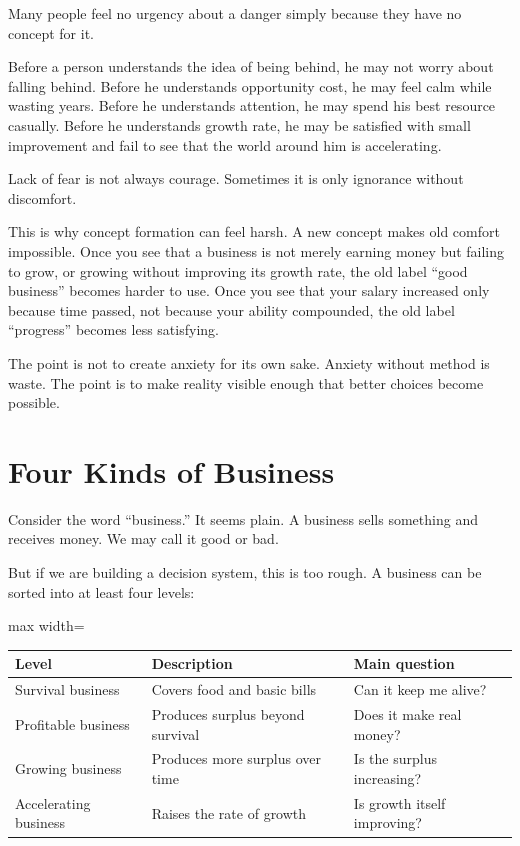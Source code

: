 Many people feel no urgency about a danger simply because they have no concept for it.

Before a person understands the idea of being behind, he may not worry about falling behind. Before he understands opportunity cost, he may feel calm while wasting years. Before he understands attention, he may spend his best resource casually. Before he understands growth rate, he may be satisfied with small improvement and fail to see that the world around him is accelerating.

Lack of fear is not always courage. Sometimes it is only ignorance without discomfort.

This is why concept formation can feel harsh. A new concept makes old comfort impossible. Once you see that a business is not merely earning money but failing to grow, or growing without improving its growth rate, the old label ``good business'' becomes harder to use. Once you see that your salary increased only because time passed, not because your ability compounded, the old label ``progress'' becomes less satisfying.

The point is not to create anxiety for its own sake. Anxiety without method is waste. The point is to make reality visible enough that better choices become possible.

\section*{Four Kinds of Business}

Consider the word ``business.'' It seems plain. A business sells something and receives money. We may call it good or bad.

But if we are building a decision system, this is too rough. A business can be sorted into at least four levels:

\begin{center}
\begin{adjustbox}{max width=\linewidth}
\begin{tabular}{lll}
\hline
Level & Description & Main question \\
\hline
Survival business & Covers food and basic bills & Can it keep me alive? \\
Profitable business & Produces surplus beyond survival & Does it make real money? \\
Growing business & Produces more surplus over time & Is the surplus increasing? \\
Accelerating business & Raises the rate of growth & Is growth itself improving? \\
\hline
\end{tabular}
\end{adjustbox}
\end{center}


